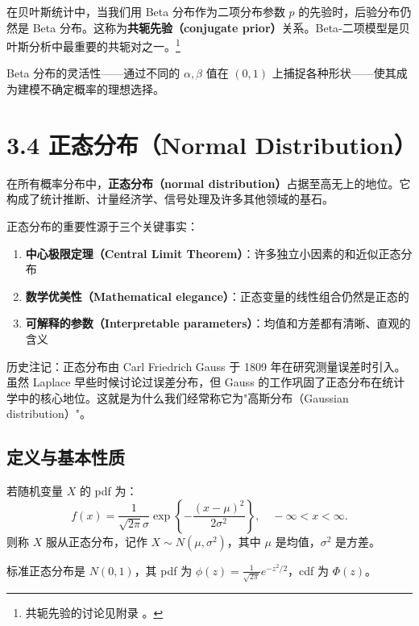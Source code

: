 \begin{example}\label{rmk:beta-conjugate-ch3}
在贝叶斯统计中，当我们用 Beta 分布作为二项分布参数 $p$ 的先验时，后验分布仍然是 Beta 分布。这称为\textbf{共轭先验（conjugate prior）}关系。Beta-二项模型是贝叶斯分析中最重要的共轭对之一。\footnote{共轭先验的讨论见附录 。}
\end{example}

Beta 分布的灵活性——通过不同的 $\alpha, \beta$ 值在 $(0,1)$ 上捕捉各种形状——使其成为建模不确定概率的理想选择。

\section{3.4 正态分布（Normal Distribution）}\label{sec:normal-distribution-ch3}

在所有概率分布中，\textbf{正态分布（normal distribution）}占据至高无上的地位。它构成了统计推断、计量经济学、信号处理及许多其他领域的基石。

正态分布的重要性源于三个关键事实：
\begin{enumerate}
\item \textbf{中心极限定理（Central Limit Theorem）}：许多独立小因素的和近似正态分布
\item \textbf{数学优美性（Mathematical elegance）}：正态变量的线性组合仍然是正态的
\item \textbf{可解释的参数（Interpretable parameters）}：均值和方差都有清晰、直观的含义
\end{enumerate}

历史注记：正态分布由 Carl Friedrich Gauss 于 1809 年在研究测量误差时引入。虽然 Laplace 早些时候讨论过误差分布，但 Gauss 的工作巩固了正态分布在统计学中的核心地位。这就是为什么我们经常称它为"高斯分布（Gaussian distribution）"。

\subsection{定义与基本性质}\label{sub:normal-definition-ch3}

\begin{definition}[正态分布]\label{def:normal-distribution-ch3}
若随机变量 $X$ 的 pdf 为：
\[
f(x) = \frac{1}{\sqrt{2\pi}\sigma} \exp\left\{ -\frac{(x-\mu)^{2}}{2\sigma^{2}} \right\}, \quad -\infty < x < \infty.
\label{eq:normal-pdf-ch3}
\]
则称 $X$ 服从正态分布，记作 $X \sim N(\mu, \sigma^{2})$，其中 $\mu$ 是均值，$\sigma^{2}$ 是方差。
\end{definition}

标准正态分布是 $N(0,1)$，其 pdf 为 $\phi(z) = \frac{1}{\sqrt{2\pi}} e^{-z^{2}/2}$，cdf 为 $\Phi(z)$。

